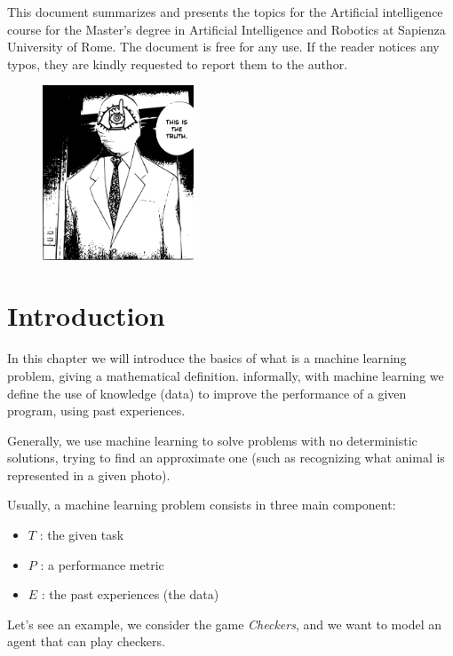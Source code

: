 \documentclass[10pt, letterpaper]{report}
\newcommand{\titolo}{Artificial intelligence }
\begin{document}
\newpage
\Large
This document summarizes and presents the topics for the \titolo course for the Master's degree in Artificial Intelligence and Robotics at Sapienza University of Rome. The document is free for any use. If the reader notices any typos, they are kindly requested to report them to the author.
\vfill
\begin{figure}[h!]
    \raggedright
    \includegraphics[width=0.4\textwidth,right ]{../../preamble/tomodachi.pdf} 
\end{figure}
\newpage %
\normalsize

\tableofcontents 
\newpage

\fancyhf{}
\fancyhead[L]{\nouppercase{\leftmark}}
\fancyfoot[C]{\thepage}
\fancyfoot[L]{\titolo}

\chapter{Introduction}
In this chapter we will introduce the basics of what is a machine learning problem, giving a mathematical definition. informally, with machine learning we define the use of knowledge (data) to improve the performance of a given program, using past experiences.\bigskip

Generally, we use machine learning to solve problems with no deterministic solutions, trying to find an approximate one (such as recognizing what animal is represented in a given photo).\bigskip 

Usually, a machine learning problem consists in three main component:\begin{itemize}
    \item $T$ : the given task
    \item $P$ : a performance metric
    \item $E$ : the past experiences (the data)
\end{itemize}
Let's see an example, we consider the game \textit{Checkers}, and we want to model an agent that can play checkers.
\end{document}
